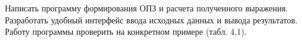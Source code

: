 Написать программу формирования ОПЗ и расчета полученного
выражения. Разработать удобный интерфейс ввода исходных данных и вывода
результатов. Работу программы проверить на конкретном примере (табл. 4.1).